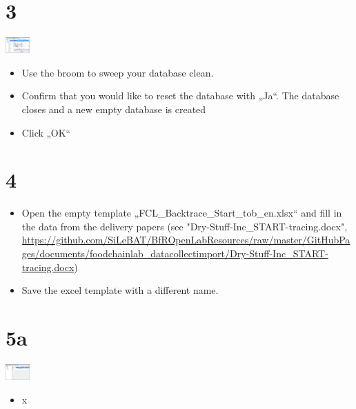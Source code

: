 \documentclass[10pt]{beamer}
\begin{document}
\section{3}
\begin{frame}
	\begin{center}
			\includegraphics[height=0.609cm]{3.png}
	\end{center}
	\begin{itemize}
		\item Use the broom to sweep your database clean.
		\item Confirm that you would like to reset the database with „Ja“. The database closes and a new empty database is created
		\item Click „OK“
	\end{itemize}
\end{frame}

\section{4}
\begin{frame}
	\begin{itemize}
		\item Open the empty template „FCL_Backtrace_Start_tob_en.xlsx“ and fill in the data from the delivery papers (see "Dry-Stuff-Inc_START-tracing.docx", \url{https://github.com/SiLeBAT/BfROpenLabResources/raw/master/GitHubPages/documents/foodchainlab_datacollectimport/Dry-Stuff-Inc_START-tracing.docx})
		\item Save the excel template with a different name.
	\end{itemize}
\end{frame}

\section{5a}
\begin{frame}
	\begin{center}
			\includegraphics[height=0.609cm]{5a.png}
	\end{center}
	\begin{itemize}
		\item x
	\end{itemize}
\end{frame}
\end{document}
